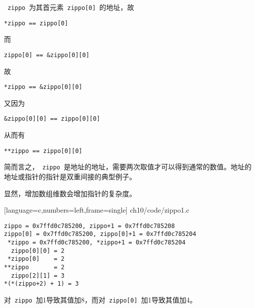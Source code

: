 \begin{frame}[fragile]\ft{\secname}
\lstinline| zippo |为其首元素\lstinline| zippo[0] |的地址，故
\vspace{.03in}
\begin{lstlisting}
*zippo == zippo[0]
\end{lstlisting}
\vspace{.03in}
而
\vspace{.03in}
\begin{lstlisting}
zippo[0] == &zippo[0][0]
\end{lstlisting}
\vspace{.03in}
故
\vspace{.03in}
\begin{lstlisting}
*zippo == &zippo[0][0]
\end{lstlisting}
\vspace{.03in}
又因为
\vspace{.03in}
\begin{lstlisting}
&zippo[0][0] == zippo[0][0]
\end{lstlisting}
\vspace{.03in}
从而有
\vspace{.03in}
\begin{lstlisting}
**zippo == zippo[0][0]
\end{lstlisting}
\vspace{.03in}
\end{frame}

\begin{frame}[fragile]\ft{\secname}
简而言之，\lstinline| zippo |是地址的地址，需要两次取值才可以得到通常的数值。地址的地址或指针的指针是双重间接的典型例子。\vspace{0.15in}

显然，增加数组维数会增加指针的复杂度。
\end{frame}

\begin{frame}\ft{\secname}

[language=c,numbers=left,frame=single]
{ch10/code/zippo1.c}
\end{frame}


\begin{frame}[fragile]\ft{\secname}
\begin{lstlisting}[backgroundcolor=\color{red!20}]
zippo = 0x7ffd0c785200, zippo+1 = 0x7ffd0c785208
zippo[0] = 0x7ffd0c785200, zippo[0]+1 = 0x7ffd0c785204
 *zippo = 0x7ffd0c785200, *zippo+1 = 0x7ffd0c785204
  zippo[0][0] = 2
 *zippo[0]    = 2
**zippo       = 2
  zippo[2][1] = 3
*(*(zippo+2) + 1) = 3
\end{lstlisting}
对\lstinline| zippo |加1导致其值加8，而对\lstinline| zippo[0] |加1导致其值加4。
\end{frame}

